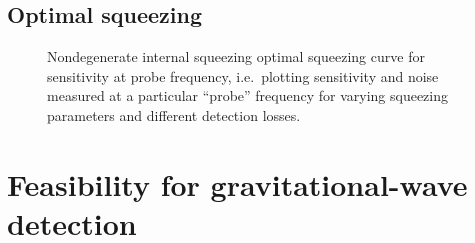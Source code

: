 



\subsection{Optimal squeezing}

\begin{figure}
	\centering
	\caption{Nondegenerate internal squeezing optimal squeezing curve for sensitivity at probe frequency, i.e.\ plotting sensitivity and noise measured at a particular ``probe'' frequency for varying squeezing parameters and different detection losses.}
	\label{fig:}
\end{figure}



\section{Feasibility for gravitational-wave detection}





